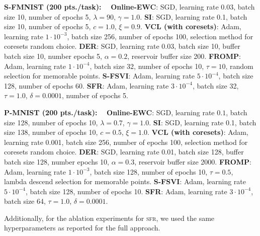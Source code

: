 \documentclass{article}
\renewcommand{\paragraph}[1]{{\bf #1}~~}
\newcommand{\our}{\textsc{sfr}\xspace}
\begin{document}
\paragraph{S-FMNIST (200 pts./task):}
	\textbf{Online-EWC}: SGD, learning rate $0.03$, batch size  10, number of epochs 5, $\lambda=90$, $\gamma=1.0$.
	\textbf{SI}: SGD, learning rate 0.1, batch size 10, number of epochs 5, $c=1.0$, $\xi=0.9$.
	\textbf{VCL (with coresets)}: Adam, learning rate $1 \cdot 10^{-3}$, batch size 256, number of epochs 100, selection method for coresets random choice.
	\textbf{DER}: SGD, learning rate 0.03, batch size 10, buffer batch size 10, number epochs 5, $\alpha =  0.2$, reservoir buffer size 200.
	\textbf{FROMP}: Adam, learning rate $1 \cdot 10^{-4}$, batch size 32, number of epochs 10, $\tau = 10$, random selection for memorable points.
	\textbf{S-FSVI}: Adam, learning rate $5 \cdot 10^{-4}$, batch size 128, number of epochs 60.
	\textbf{SFR}: Adam, learning rate $3 \cdot 10^{-4}$, batch size 32, $\tau=1.0$, $\delta=0.0001$, number of epochs 5.


\paragraph{P-MNIST (200 pts./task):}
	\textbf{Online-EWC}: SGD, learning rate $0.1$, batch size 128, number of epochs 10, $\lambda=0.7$, $\gamma=1.0$.
	\textbf{SI}: SGD, learning rate 0.1, batch size 138, number of epochs 10, $c=0.5$, $\xi=1.0$. 
	\textbf{VCL (with coresets)}: Adam, learning rate 0.001, batch size 256, number of epochs 100, selection method for coresets random choice.
	\textbf{DER}:  SGD, learning rate 0.01, batch size 128, buffer batch size 128, number epochs 10, $\alpha=0.3$, reservoir buffer size 2000.
	\textbf{FROMP}: Adam, learning rate $1 \cdot 10^{-3}$, batch size 128, number of epochs 10, $\tau = 0.5$, lambda descend selection for memorable points.
	\textbf{S-FSVI}: Adam, learning rate $5 \cdot 10^{-4}$, batch size 128, number of epochs 10.
	\textbf{SFR}: Adam, learning rate $3 \cdot 10^{-4}$, batch size 64, $\tau=1.0$, $\delta=0.0001$. 


Additionally, for the ablation experiments for \our, we used the same hyperparameters as reported for the full approach.
\end{document}
